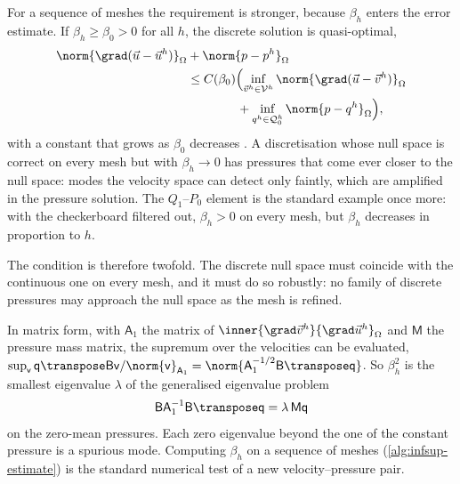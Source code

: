 For a sequence of meshes the requirement is stronger, because $\beta_h$ enters the error estimate. If $\beta_h \geq \beta_0 > 0$ for all $h$, the discrete solution is quasi-optimal,
\begin{equation}\label{eq:infsup-error}
\begin{split}
    \norm{\grad(\vec{u} - \vec{u}^h)}_\Omega &+ \norm{p - p^h}_\Omega \\
    &\leq C(\beta_0) \Bigl( \inf_{\vec{v}^h \in \mathcal{V}^h} \norm{\grad(\vec{u} - \vec{v}^h)}_\Omega \\
    &\qquad\qquad + \inf_{q^h \in \mathcal{Q}^h_0} \norm{p - q^h}_\Omega \Bigr) ,
\end{split}
\end{equation}
with a constant that grows as $\beta_0$ decreases \parencite{Brezzi1974,Boffi2013}. A discretisation whose null space is correct on every mesh but with $\beta_h \to 0$ has pressures that come ever closer to the null space: modes the velocity space can detect only faintly, which are amplified in the pressure solution. The $Q_1$--$P_0$ element is the standard example once more: with the checkerboard filtered out, $\beta_h > 0$ on every mesh, but $\beta_h$ decreases in proportion to $h$.

\begin{remark}
The condition is therefore twofold. The discrete null space must coincide with the continuous one on every mesh, and it must do so robustly: no family of discrete pressures may approach the null space as the mesh is refined.
\end{remark}

In matrix form, with $\mathsf{A}_1$ the matrix of $\inner{\grad\vec{v}^h}{\grad\vec{u}^h}_\Omega$ and $\mathsf{M}$ the pressure mass matrix, the supremum over the velocities can be evaluated, $\sup_{\mathsf{v}} \mathsf{q}\transpose\mathsf{B}\mathsf{v} / \norm{\mathsf{v}}_{\mathsf{A}_1} = \norm{\mathsf{A}_1^{-1/2} \mathsf{B}\transpose \mathsf{q}}$. So $\beta_h^2$ is the smallest eigenvalue $\lambda$ of the generalised eigenvalue problem
\begin{equation}\label{eq:infsup-eigen}
    \mathsf{B} \mathsf{A}_1^{-1} \mathsf{B}\transpose \mathsf{q} = \lambda\, \mathsf{M} \mathsf{q}
\end{equation}
on the zero-mean pressures. Each zero eigenvalue beyond the one of the constant pressure is a spurious mode. Computing $\beta_h$ on a sequence of meshes (\cref{alg:infsup-estimate}) is the standard numerical test of a new velocity--pressure pair.

